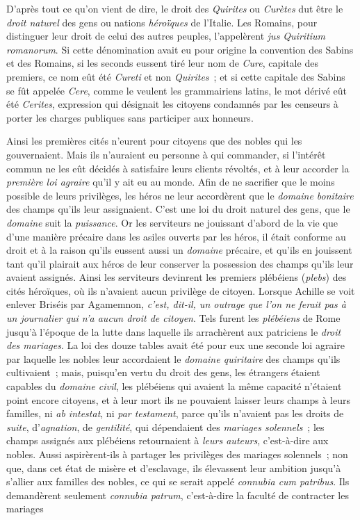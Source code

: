 \documentclass[french,twoside]{book} %
\begin{document}
D’après tout ce qu’on vient de dire, le droit des {\itshape Quirites} ou {\itshape Curètes} dut être le {\itshape droit naturel} des gens ou nations {\itshape héroïques} de l’Italie. Les Romains, pour distinguer leur droit de celui des autres peuples, l’appelèrent {\itshape jus Quiritium romanorum}. Si cette dénomination avait eu pour origine la convention des Sabins et des Romains, si les seconds eussent tiré leur nom de {\itshape Cure}, capitale des premiers, ce nom eût été {\itshape Cureti} et non {\itshape Quirites} ; et si cette capitale des Sabins se fût appelée {\itshape Cere}, comme le veulent les grammairiens latins, le mot dérivé eût été {\itshape Cerites}, expression qui désignait les citoyens condamnés par les censeurs à porter les charges publiques sans participer aux honneurs.\par
Ainsi les premières cités n’eurent pour citoyens que des nobles qui les gouvernaient. Mais ils n’auraient eu personne à qui commander, si l’intérêt commun ne les eût décidés à satisfaire leurs clients révoltés, et à leur accorder la {\itshape première loi agraire}  qu’il y ait eu au monde. Afin de ne sacrifier que le moins possible de leurs privilèges, les héros ne leur accordèrent que le {\itshape domaine bonitaire} des champs qu’ils leur assignaient. C’est une loi du droit naturel des gens, que le {\itshape domaine} suit la {\itshape puissance}. Or les serviteurs ne jouissant d’abord de la vie que d’une manière précaire dans les asiles ouverts par les héros, il était conforme au droit et à la raison qu’ils eussent aussi un {\itshape domaine} précaire, et qu’ils en jouissent tant qu’il plairait aux héros de leur conserver la possession des champs qu’ils leur avaient assignés. Ainsi les serviteurs devinrent les premiers plébéiens ({\itshape plebs}) des cités héroïques, où ils n’avaient aucun privilège de citoyen. Lorsque Achille se voit enlever Briséis par Agamemnon, \emph{{\itshape c’est}, dit-il, {\itshape  un outrage que l’on ne ferait pas à un journalier qui n’a aucun droit de citoyen}}. Tels furent les {\itshape plébéiens} de Rome jusqu’à l’époque de la lutte dans laquelle ils arrachèrent aux patriciens le {\itshape droit des mariages}. La loi des douze tables avait été pour eux une seconde loi agraire par laquelle les nobles leur accordaient le {\itshape domaine quiritaire} des champs qu’ils cultivaient ; mais, puisqu’en vertu du droit des gens, les étrangers étaient capables du {\itshape domaine civil}, les plébéiens qui avaient la même capacité n’étaient point encore citoyens, et à leur mort ils ne pouvaient laisser leurs champs à leurs familles, ni {\itshape ab intestat}, ni {\itshape par testament}, parce qu’ils n’avaient pas les droits de {\itshape suite}, d’{\itshape agnation}, de {\itshape gentilité}, qui dépendaient des {\itshape mariages solennels} ; les champs  assignés aux plébéiens retournaient à {\itshape leurs auteurs}, c’est-à-dire aux nobles. Aussi aspirèrent-ils à partager les privilèges des mariages solennels ; non que, dans cet état de misère et d’esclavage, ils élevassent leur ambition jusqu’à s’allier aux familles des nobles, ce qui se serait appelé {\itshape connubia cum patribus}. Ils demandèrent seulement {\itshape connubia patrum}, c’est-à-dire la faculté de contracter les mariages 
\end{document}
